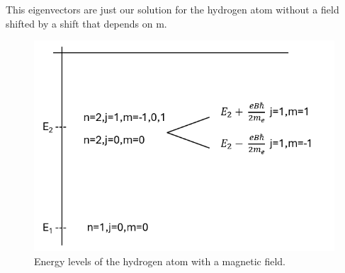 This eigenvectors are just our solution for the hydrogen atom without a field shifted by a shift that depends on m.

\begin{figure}[H]
  \centering
  \includegraphics{images10/energy.PNG}
  \caption{Energy levels of the hydrogen atom with a magnetic field.}
\end{figure}
